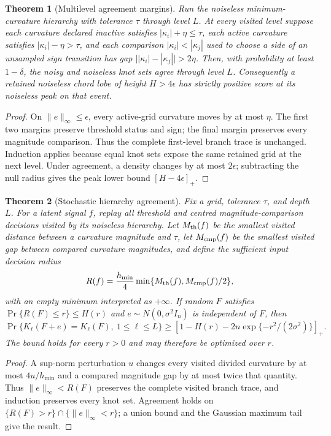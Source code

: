 \documentclass[review,onefignum,onetabnum]{siamonline250211}
\newtheorem{theorem}{Theorem}
\begin{document}
\begin{theorem}[Multilevel agreement margins]
\label{thm:hierarchy-margin}
Run the noiseless minimum-curvature hierarchy with tolerance $\tau$ through
level $L$.  At every visited level suppose each curvature declared inactive
satisfies $|\kappa_i|+\eta\le\tau$, each active curvature satisfies
$|\kappa_i|-\eta>\tau$, and each comparison
$|\kappa_i|<|\kappa_j|$ used to choose a side of an unsampled sign transition
has gap $\big||\kappa_i|-|\kappa_j|\big|>2\eta$.  Then, with probability at
least $1-\delta$, the noisy and noiseless knot sets agree through level $L$.
Consequently a retained noiseless chord lobe of height $H>4\epsilon$ has
strictly positive score at its noiseless peak on that event.
\end{theorem}
\begin{proof}
On $\|e\|_\infty\le\epsilon$, every active-grid curvature moves by at most
$\eta$.  The first two margins preserve threshold status and sign; the final
margin preserves every magnitude comparison.  Thus the complete first-level
branch trace is unchanged.  Induction applies because equal knot sets expose
the same retained grid at the next level.  Under agreement, a density changes
by at most $2\epsilon$; subtracting the null radius gives the peak lower bound
$[H-4\epsilon]_+$.
\end{proof}

\ifdefined\SPsubmission
\else
\begin{theorem}[Stochastic hierarchy agreement]
\label{thm:stochastic-margin}
Fix a grid, tolerance $\tau$, and depth $L$.  For a latent signal $f$, replay
all threshold and centred magnitude-comparison decisions visited by its
noiseless hierarchy.  Let $M_{\rm th}(f)$ be the smallest visited distance
between a curvature magnitude and $\tau$, let $M_{\rm cmp}(f)$ be the smallest
visited gap between compared curvature magnitudes, and define the sufficient
input decision radius
\begin{equation}
 R(f)=\frac{h_{\min}}4
 \min\{M_{\rm th}(f),M_{\rm cmp}(f)/2\},
\end{equation}
with an empty minimum interpreted as $+\infty$.  If random $F$ satisfies
$\Pr\{R(F)\le r\}\le H(r)$ and $e\sim N(0,\sigma^2I_n)$ is independent of
$F$, then
\begin{equation}
 \Pr\{K_\ell(F+e)=K_\ell(F),\ 1\le\ell\le L\}
 \ge
 \left[1-H(r)-2n\exp\{-r^2/(2\sigma^2)\}\right]_+ .
\end{equation}
The bound holds for every $r>0$ and may therefore be optimized over $r$.
\end{theorem}
\begin{proof}
A sup-norm perturbation $u$ changes every visited divided curvature by at most
$4u/h_{\min}$ and a compared magnitude gap by at most twice that quantity.
Thus $\|e\|_\infty<R(F)$ preserves the complete visited branch trace, and
induction preserves every knot set.  Agreement holds on
$\{R(F)>r\}\cap\{\|e\|_\infty<r\}$; a union bound and the Gaussian maximum
tail give the result.
\end{proof}
\end{document}
